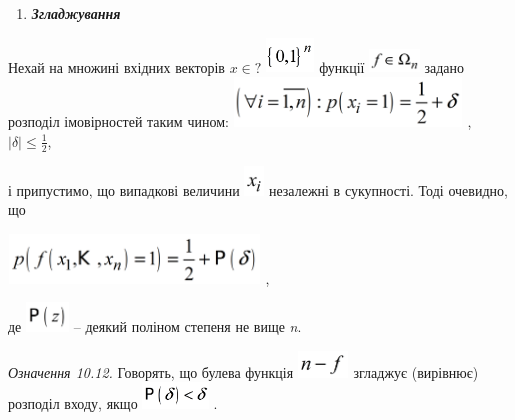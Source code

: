 \documentclass[a4paper]{article}
\newcounter{saveenum}
\newcommand\liststyleWWviiiNumxxix{%
\renewcommand\theenumi{\arabic{enumi}}
\renewcommand\theenumii{\arabic{enumii}}
\renewcommand\theenumiii{\roman{enumiii}}
\renewcommand\theenumiv{\arabic{enumiv}}
\renewcommand\labelenumi{\theenumi.}
\renewcommand\labelenumii{\theenumii.}
\renewcommand\labelenumiii{\theenumiii.}
\renewcommand\labelenumiv{\theenumiv.}
}
\newcounter{}
\begin{document}
\liststyleWWviiiNumxxix
\setcounter{saveenum}{\value{enumi}}
\begin{enumerate}
\setcounter{enumi}{\value{saveenum}}
\item {\bfseries\itshape
Згладжування}
\end{enumerate}
Нехай на множині  вхідних векторів  ${x\in ?}$
\includegraphics[width=0.5047in,height=0.3638in]{crypt-img/crypt-img238.png} 
функції 
\includegraphics[width=0.528in,height=0.25in]{crypt-img/crypt-img239.png} 
задано розподіл імовірностей таким чином: 
\includegraphics[width=2.389in,height=0.522in]{crypt-img/crypt-img240.png} , 
${|\delta |\le \frac{1}{2}}$,

і припустимо, що випадкові величини 
\includegraphics[width=0.2083in,height=0.3134in]{crypt-img/crypt-img241.png} 
незалежні в сукупності. Тоді очевидно, що

{\centering
 \includegraphics[width=2.6339in,height=0.5193in]{crypt-img/crypt-img242.png} ,
\par}

де  \includegraphics[width=0.4492in,height=0.311in]{crypt-img/crypt-img243.png} 
– деякий поліном степеня не вище \textit{n}.

 \textit{Означення 10.12.}\textit{ }Говорять, що булева функція 
\includegraphics[width=0.5319in,height=0.2791in]{crypt-img/crypt-img244.png} 
згладжує (вирівнює) розподіл входу, якщо 
\includegraphics[width=0.6937in,height=0.278in]{crypt-img/crypt-img245.png} .
\end{document}
